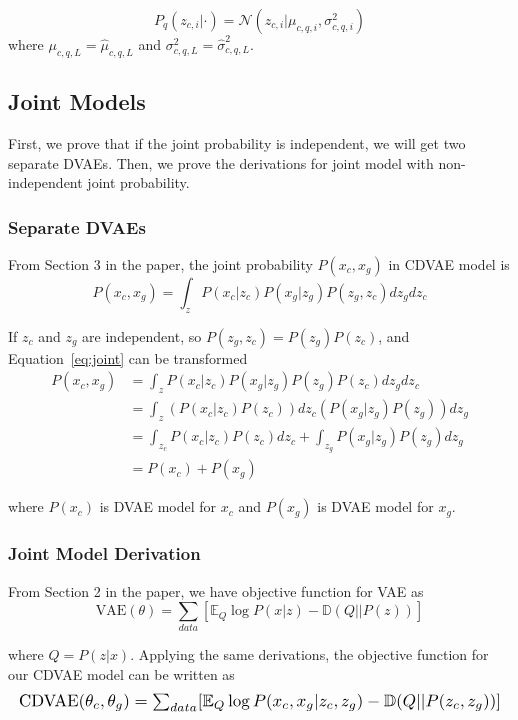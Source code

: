 \documentclass[10pt,twocolumn,letterpaper]{article}
\begin{document}
\begin{equation}
P_{q}(z_{c,i}|\cdot) = \mathcal{N} (z_{c,i}|\mu_{c,q,i}, \sigma_{c,q,i}^2)
\end{equation}
where $\mu_{c,q,L} = \hat{\mu}_{c,q,L}$ and $\sigma_{c,q,L}^2 = \hat{\sigma}_{c,q,L}^2$.


\subsection{Joint Models}
First, we prove that if the joint probability is independent, we will get two separate DVAEs. Then, we prove the derivations for joint model with non-independent joint probability. 

\subsubsection{Separate DVAEs}
From Section 3 in the paper, the joint probability $P(x_c, x_g)$ in CDVAE model is
\begin{equation}
P(x_c, x_g) = \int_z P(x_c|z_c) P(x_g|z_g) P(z_g, z_c) dz_g dz_c
\label{eq:joint}
\end{equation}

If $z_c$ and $z_g$ are independent, so $P(z_g, z_c) = P(z_g) P(z_c)$, and Equation~\ref{eq:joint} can be transformed
\begin{equation}
\begin{split}
P(x_c, x_g) & = \int_z P(x_c|z_c) P(x_g|z_g) P(z_g) P(z_c) dz_g dz_c \\
& = \int_z (P(x_c|z_c) P(z_c)) dz_c (P(x_g|z_g) P(z_g)) dz_g \\
& = \int_{z_c} P(x_c|z_c) P(z_c) dz_c + \int_{z_g} P(x_g|z_g) P(z_g) dz_g \\
& = P(x_c) + P(x_g)
\end{split}
\end{equation}

where $P(x_c)$ is DVAE model for $x_c$ and $P(x_g)$ is DVAE model for $x_g$.

\subsubsection{Joint Model Derivation}
From Section 2 in the paper, we have objective function for VAE as
\begin{equation}
\mbox{VAE}(\theta) = \sum_{data}[\mathbb{E}_Q \log P(x|z) - \mathbb{D}(Q || P(z))]
\end{equation}

where $Q=P(z|x)$. Applying the same derivations, the objective function for our CDVAE model can be written as
\begin{equation}
\resizebox{1.0\hsize}{!}{$ \mbox{CDVAE}(\theta_c, \theta_g) = \sum_{data}[\mathbb{E}_Q \log P(x_c, x_g|z_c, z_g) - \mathbb{D}(Q || P(z_c, z_g))] $}
\label{eq:cdvae}
\end{equation}
\end{document}
